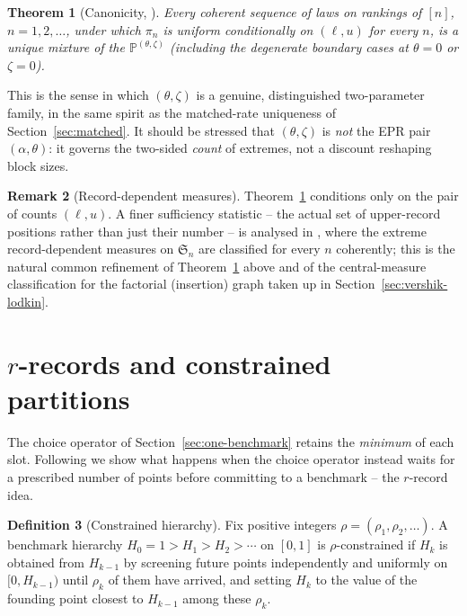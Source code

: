 \documentclass[11pt]{article}
\newcommand{\PP}{\mathbb{P}}
\theoremstyle{plain}
\newtheorem{theorem}{Theorem}[section]
\theoremstyle{definition}
\newtheorem{definition}[theorem]{Definition}
\newtheorem{remark}[theorem]{Remark}
\begin{document}
\begin{theorem}[Canonicity, {\cite[Prop.~6]{GnedinRecords2007}}]
\label{thm:canonicity}
Every coherent sequence of laws on rankings of \([n]\), \(n=1,2,\dots\), under which \(\pi_n\) is uniform conditionally on \((\ell,u)\) for every \(n\), is a unique mixture of the \(\PP^{(\theta,\zeta)}\) (including the degenerate boundary cases at \(\theta=0\) or \(\zeta=0\)).
\end{theorem}

This is the sense in which \((\theta,\zeta)\) is a genuine, distinguished two-parameter family, in the same spirit as the matched-rate uniqueness of Section~\ref{sec:matched}. It should be stressed that \((\theta,\zeta)\) is \emph{not} the EPR pair \((\alpha,\theta)\): it governs the two-sided \emph{count} of extremes, not a discount reshaping block sizes. 

\begin{remark}[Record-dependent measures]
Theorem~\ref{thm:canonicity} conditions only on the pair of counts \((\ell,u)\). A finer sufficiency statistic -- the actual set of upper-record positions rather than just their number -- is analysed in \cite{GnedinBiasRecord}, where the extreme record-dependent measures on \(\mathfrak S_n\) are classified for every \(n\) coherently; this is the natural common refinement of Theorem~\ref{thm:canonicity} above and of the central-measure classification for the factorial (insertion) graph taken up in Section~\ref{sec:vershik-lodkin}.
\end{remark}

\section{\(r\)-records and constrained partitions} 

\label{sec:constrained}

The choice operator of Section~\ref{sec:one-benchmark} retains the \emph{minimum} of each slot.  Following \cite{GnedinConstrained2006} we show what happens when the choice operator instead waits for a prescribed number of points before committing to a benchmark -- the \(r\)-record idea.

\begin{definition}[Constrained hierarchy]
Fix positive integers \(\rho=(\rho_1,\rho_2,\dots)\). A benchmark hierarchy \(H_0=1>H_1>H_2>\cdots\) on \([0,1]\) is \(\rho\)-constrained if \(H_k\) is obtained from \(H_{k-1}\) by screening future points independently and uniformly on \([0,H_{k-1})\) until \(\rho_k\) of them have arrived, and setting \(H_k\) to the value of the founding point closest to \(H_{k-1}\) among these \(\rho_k\).
\end{definition}
\end{document}
